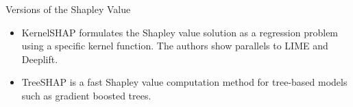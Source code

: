 \documentclass[aspectratio=169]{../latex_main/tntbeamer}  %
\begin{document}
\begin{frame}{Versions of the Shapley Value  }

  \begin{itemize}
  \item KernelSHAP formulates the Shapley value solution as a regression problem using a specific kernel function. The authors show parallels to LIME and Deeplift.
  \item TreeSHAP is a fast Shapley value computation method for tree-based models such as gradient boosted trees.
 \end{itemize}
\end{frame}
\end{document}
